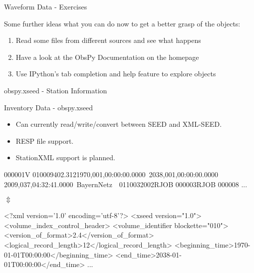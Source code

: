 \begin{frame}{Waveform Data - Exercises}

    Some further ideas what you can do now to get a better grasp of the objects:

    \begin{enumerate}
        \item Read some files from different sources and see what happens
        \item Have a look at the ObsPy Documentation on the homepage
        \item Use IPython's tab completion and help feature to explore objects
    \end{enumerate}


\end{frame}

\begin{frame}{}
    \begin{center}
        \textcolor{lmu@darkgreen}{\LARGE{obspy.xseed - Station Information}}
    \end{center}
\end{frame}

\begin{frame}{Inventory Data - obspy.xseed}
    \begin{itemize}
        \item Can currently read/write/convert between SEED and XML-SEED.
        \item RESP file support.
        \item StationXML support is planned.
    \end{itemize}


\footnotesize
\begin{myColorBox}{0.95}{}
\begin{semiverbatim}
000001V 010009402.3121970,001,00:00:00.0000~2038,001,00:00:00.0000~
2009,037,04:32:41.0000~BayernNetz~~0110032002RJOB 000003RJOB 000008
...
\end{semiverbatim}
\end{myColorBox}

\large
\begin{center}
    $\Updownarrow$
\end{center}

\footnotesize


\begin{myColorBox}{0.95}{}
\begin{semiverbatim}
<?xml version='1.0' encoding='utf-8'?>
<xseed version="1.0">
  <volume_index_control_header>
    <volume_identifier blockette="010">
      <version_of_format>2.4</version_of_format>
      <logical_record_length>12</logical_record_length>
      <beginning_time>1970-01-01T00:00:00</beginning_time>
      <end_time>2038-01-01T00:00:00</end_time>
...
\end{semiverbatim}
\end{myColorBox}

\normalsize

\end{frame}


